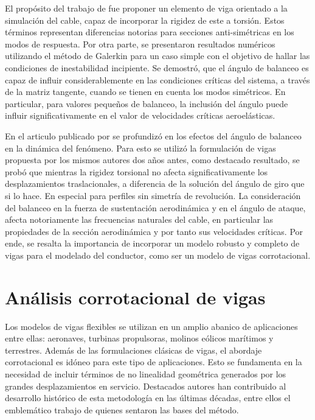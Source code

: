 El propósito del trabajo de \cite{luongo2007linear} fue proponer un elemento de viga orientado a la simulación del cable, capaz de incorporar la rigidez de este a torsión. Estos términos representan diferencias notorias para secciones anti-simétricas en los modos de respuesta. Por otra parte, se presentaron resultados numéricos utilizando el método de Galerkin para un caso simple con el objetivo de hallar las condiciones de inestabilidad incipiente. Se demostró, que el ángulo de balanceo es capaz de influir considerablemente en las condiciones críticas del sistema, a través de la matriz tangente, cuando se tienen en cuenta los modos simétricos. En particular, para valores pequeños de balanceo, la inclusión del ángulo puede influir significativamente en el valor de velocidades críticas aeroelásticas.

En el articulo publicado por \cite{luongo2009effect} se profundizó en los efectos del ángulo de balanceo en la dinámica del fenómeno. Para esto se utilizó la formulación de vigas propuesta por los mismos autores dos años antes, como destacado resultado, se probó que mientras la rigidez torsional no afecta significativamente los desplazamientos traslacionales, a diferencia de la solución del ángulo de giro que si lo hace. En especial para perfiles sin simetría de revolución. La consideración del balanceo en la fuerza de sustentación aerodinámica y en el ángulo de ataque, afecta notoriamente las frecuencias naturales del cable, en particular las propiedades de la sección aerodinámica y por tanto sus velocidades críticas. Por ende, se resalta la importancia de incorporar un modelo robusto y completo de vigas para el modelado del conductor, como ser un modelo de vigas corrotacional.



\section{Análisis corrotacional de vigas}\label{Sec:EA:Corrotacional}
Los modelos de vigas flexibles se utilizan en un amplio abanico de aplicaciones entre ellas: aeronaves, turbinas propulsoras, molinos eólicos marítimos y terrestres. Además de las formulaciones clásicas de vigas, el abordaje corrotacional es idóneo para este tipo de aplicaciones. Esto se fundamenta en la necesidad de incluir términos de no linealidad geométrica generados por los grandes desplazamientos en servicio. Destacados autores han contribuido al desarrollo histórico de esta metodología en las últimas décadas, entre ellos el emblemático trabajo de \cite{Nour-Omid1991} quienes sentaron las bases del método. 

